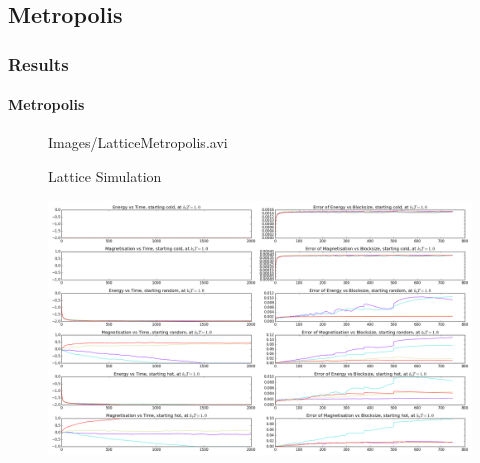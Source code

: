 \documentclass[11pt,notes]{beamer}
\begin{document}
\subsection{Metropolis}
\begin{frame}
\frametitle{Results}
\framesubtitle{Metropolis}
	\begin{figure}[h!]
		\centering
		{Images/LatticeMetropolis.avi}
		\caption{Lattice Simulation}
	\end{figure}
\end{frame}
\begin{frame}
	\begin{figure}
		\centering
		\includegraphics[width=1.0\textwidth]{Images/MC1}
	\end{figure}
\end{frame}
\end{document}
